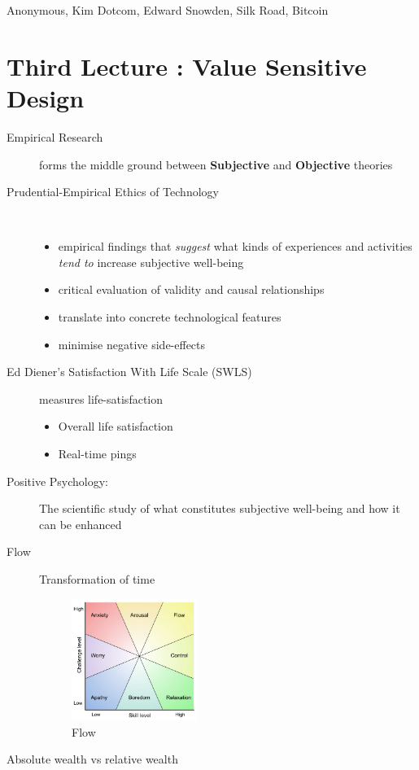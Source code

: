 \documentclass[a4paper]{article}
\begin{document}
Anonymous, Kim Dotcom, Edward Snowden, Silk Road, Bitcoin

\section{Third Lecture : Value Sensitive Design}

\begin{description}
\item[Empirical Research] forms the middle ground between \textbf{Subjective} and \textbf{Objective} theories
\item[Prudential-Empirical Ethics of Technology]~
\begin{itemize}
\item empirical findings that \textit{suggest} what kinds of experiences and activities \textit{tend to} increase subjective well-being
\item critical evaluation of validity and causal relationships
\item translate into concrete technological features
\item minimise negative side-effects
\end{itemize}
\item[Ed Diener's Satisfaction With Life Scale (SWLS)] measures life-satisfaction
\begin{itemize}
\item Overall life satisfaction
\item Real-time pings
\end{itemize}
\item[Positive Psychology:] The scientific study of what constitutes subjective well-being and how it can be enhanced
\item[Flow] Transformation of time
\begin{figure}[H]
\centering
\includegraphics[width=0.4\textwidth]{pictures/Flow}
\caption{Flow}
\end{figure}
\item[Absolute wealth vs relative wealth] ~

\end{description}
\end{document}
